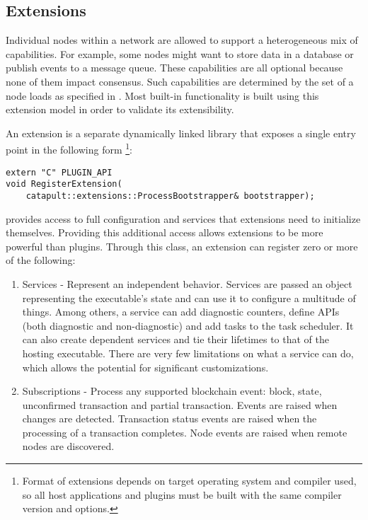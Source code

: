 \subsection{\codenamespace Extensions}
\label{sec:system:extensions}

Individual nodes within a network are allowed to support a heterogeneous mix of capabilities.
For example, some nodes might want to store data in a database or publish events to a message queue.
These capabilities are all optional because none of them impact consensus.
Such capabilities are determined by the set of  a node loads as specified in .
Most built-in \codenamespace functionality is built using this extension model in order to validate its extensibility.

An extension is a separate dynamically linked library that exposes a single entry point in the following form
\footnote{Format of extensions depends on target operating system and compiler used, so all host applications and plugins must be built with the same compiler version and options.}:

\begin{lstlisting}
extern "C" PLUGIN_API
void RegisterExtension(
	catapult::extensions::ProcessBootstrapper& bootstrapper);
\end{lstlisting}

 provides access to full \codenamespace configuration and services that extensions need to initialize themselves.
Providing this additional access allows extensions to be more powerful than plugins.
Through this class, an extension can register zero or more of the following:

\begin{enumerate}
	\item{Services -
		Represent an independent behavior.
		Services are passed an object representing the executable's state and can use it to configure a multitude of things.
		Among others, a service can add diagnostic counters, define APIs (both diagnostic and non-diagnostic) and add tasks to the task scheduler.
		It can also create dependent services and tie their lifetimes to that of the hosting executable.
		There are very few limitations on what a service can do, which allows the potential for significant customizations.
	}
	\item{Subscriptions -
		Process any supported blockchain event: block, state, unconfirmed transaction and partial transaction.
		Events are raised when changes are detected.
		Transaction status events are raised when the processing of a transaction completes.
		Node events are raised when remote nodes are discovered.
	}
\end{enumerate}

